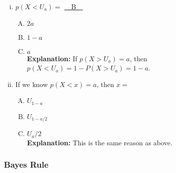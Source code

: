 \documentclass[11pt]{article} %
\begin{document}
\begin{enumerate}[(a)]
\begin{enumerate}[i. ]
\begin{enumerate}[A. ]
\end{enumerate}
\item $p(X < U_a) = $ \underline{~~B~~}
\begin{enumerate}[A. ]
\item $2a$
\item $1-a$
\item $a$ \\
{\bf Explanation:} If $p(X>U_a) = a$, then $p(X<U_a) = 1 - P(X>U_a) = 1 - a$.
\end{enumerate}
\item If we know $p(X<x) = a$, then $x = $
\begin{enumerate}[A. ]
\item $U_{1-a}$
\item $U_{1-a/2}$
\item $U_a/2$ \\
{\bf Explanation:} This is the same reason as above.
\end{enumerate}
\end{enumerate}
\end{enumerate}

\subsubsection{Bayes Rule}
\end{document}
